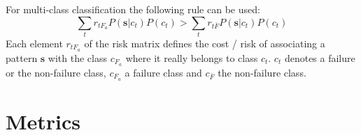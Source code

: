 \documentclass[mscthesis]{usiinfthesis}
\begin{document}
For multi-class classification the following rule can be used:
\begin{equation}
    \sum_t r_{tF_a} P(\boldsymbol{s}|c_t) P(c_t)
    > \sum_t r_{t\bar{F}} P(\boldsymbol{s}|c_t) P(c_t)
\end{equation}
Each element $r_{tF_a}$ of the risk matrix defines the cost / risk of
associating a pattern $\boldsymbol{s}$ with the class $c_{F_a}$ where it really
belongs to class $c_t$. $c_t$ denotes a failure or the non-failure class,
$c_{F_a}$ a failure class and $c_{\bar{F}}$ the non-failure class.

\section{Metrics}
\label{ch:event_metrics}
\end{document}
